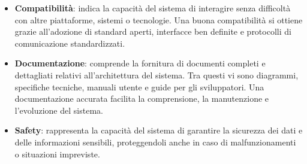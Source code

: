 \begin{itemize}
    \item \textbf{Compatibilità}: indica la capacità del sistema di interagire senza difficoltà con altre piattaforme, sistemi o tecnologie. Una buona compatibilità si ottiene grazie all'adozione di standard aperti, interfacce ben definite e protocolli di comunicazione standardizzati.
    \item \textbf{Documentazione}: comprende la fornitura di documenti completi e dettagliati relativi all'architettura del sistema. Tra questi vi sono diagrammi, specifiche tecniche, manuali utente e guide per gli sviluppatori. Una documentazione accurata facilita la comprensione, la manutenzione e l'evoluzione del sistema.
    \item \textbf{Safety}: rappresenta la capacità del sistema di garantire la sicurezza dei dati e delle informazioni sensibili, proteggendoli anche in caso di malfunzionamenti o situazioni impreviste.
\end{itemize}


